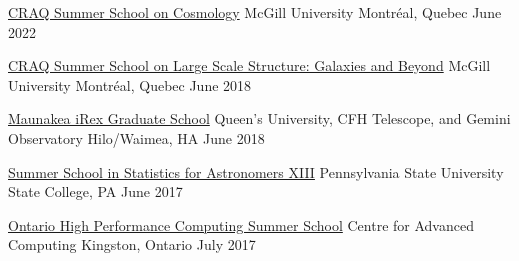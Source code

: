 

\begin{cvhonors}

  \cvhonor
    {\href{http://craq-astro.ca/summerschool/?lang=en}{CRAQ Summer School on Cosmology}} %
    {McGill University} %
    {Montr{\'e}al, Quebec} %
    {June 2022} %
    
  \cvhonor
    {\href{http://craq-astro.ca/summerschool/?lang=en}{CRAQ Summer School on Large Scale Structure: Galaxies and Beyond}} %
    {McGill University} %
    {Montr{\'e}al, Quebec} %
    {June 2018} %

  \cvhonor
    {\href{https://www.physics.queensu.ca/facultysites/courteau/maunakea-graduate-school/}{Maunakea iRex Graduate School}} %
    {Queen’s University, CFH Telescope, and Gemini Observatory} %
    {Hilo/Waimea, HA} %
    {June 2018} %
        
       
  \cvhonor
    {\href{http://astrostatistics.psu.edu/su17/}{Summer School in Statistics for Astronomers XIII}} %
    {Pennsylvania State University} %
    {State College, PA} %
    {June 2017} %
        
  \cvhonor
    {\href{https://cac.queensu.ca/}{Ontario High Performance Computing Summer School}} %
    {Centre for Advanced Computing} %
    {Kingston, Ontario} %
    {July 2017} %
        
\end{cvhonors}